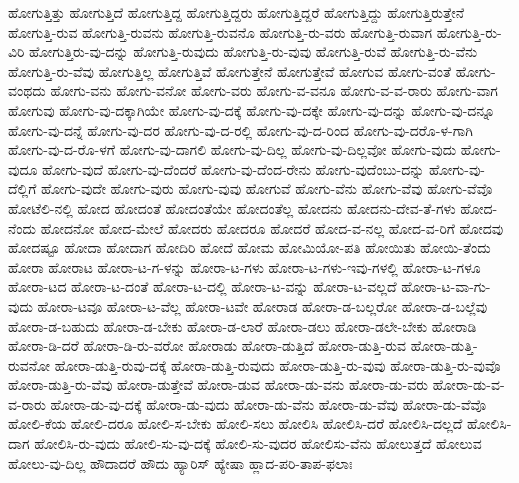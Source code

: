 {ಹೋಗುತ್ತಿತ್ತು
ಹೋಗುತ್ತಿದೆ
ಹೋಗುತ್ತಿದ್ದ
ಹೋಗುತ್ತಿದ್ದರು
ಹೋಗುತ್ತಿದ್ದರೆ
ಹೋಗುತ್ತಿದ್ದು
ಹೋಗುತ್ತಿರುತ್ತೇನೆ
ಹೋಗುತ್ತಿ-ರುವ
ಹೋಗುತ್ತಿ-ರುವನು
ಹೋಗುತ್ತಿ-ರುವನೊ
ಹೋಗುತ್ತಿ-ರು-ವರು
ಹೋಗುತ್ತಿ-ರುವಾಗ
ಹೋಗುತ್ತಿ-ರು-ವಿರಿ
ಹೋಗುತ್ತಿರು-ವು-ದನ್ನು
ಹೋಗುತ್ತಿ-ರುವುದು
ಹೋಗುತ್ತಿ-ರು-ವುವು
ಹೋಗುತ್ತಿ-ರುವೆ
ಹೋಗುತ್ತಿ-ರು-ವೆನು
ಹೋಗುತ್ತಿ-ರು-ವೆವು
ಹೋಗುತ್ತಿಲ್ಲ
ಹೋಗುತ್ತಿವೆ
ಹೋಗುತ್ತೇನೆ
ಹೋಗುತ್ತೇವೆ
ಹೋಗುವ
ಹೋಗು-ವಂತೆ
ಹೋಗು-ವಂಥದು
ಹೋಗು-ವನು
ಹೋಗು-ವನೋ
ಹೋಗು-ವರು
ಹೋಗು-ವ-ವನೂ
ಹೋಗು-ವ-ವ-ರಾರು
ಹೋಗು-ವಾಗ
ಹೋಗುವು
ಹೋಗು-ವು-ದಕ್ಕಾಗಿಯೇ
ಹೋಗು-ವು-ದಕ್ಕೆ
ಹೋಗು-ವು-ದಕ್ಕೇ
ಹೋಗು-ವು-ದನ್ನು
ಹೋಗು-ವು-ದನ್ನೂ
ಹೋಗು-ವು-ದನ್ನೆ
ಹೋಗು-ವು-ದರ
ಹೋಗು-ವು-ದ-ರಲ್ಲಿ
ಹೋಗು-ವು-ದ-ರಿಂದ
ಹೋಗು-ವು-ದರೊ-ಳ-ಗಾಗಿ
ಹೋಗು-ವು-ದ-ರೊ-ಳಗೆ
ಹೋಗು-ವು-ದಾಗಲಿ
ಹೋಗು-ವು-ದಿಲ್ಲ
ಹೋಗು-ವು-ದಿಲ್ಲವೋ
ಹೋಗು-ವುದು
ಹೋಗು-ವುದೂ
ಹೋಗು-ವುದೆ
ಹೋಗು-ವು-ದೆಂದರೆ
ಹೋಗು-ವು-ದೆಂದ-ರೇನು
ಹೋಗು-ವುದೆಂಬು-ದನ್ನು
ಹೋಗು-ವು-ದೆಲ್ಲಿಗೆ
ಹೋಗು-ವುದೇ
ಹೋಗು-ವುರು
ಹೋಗು-ವುವು
ಹೋಗುವೆ
ಹೋಗು-ವೆನು
ಹೋಗು-ವೆವು
ಹೋಗು-ವೆವೊ
ಹೋಟೆಲಿ-ನಲ್ಲಿ
ಹೋದ
ಹೋದಂತೆ
ಹೋದಂತೆಯೇ
ಹೋದಂತೆಲ್ಲ
ಹೋದನು
ಹೋದನು-ದೇವ-ತೆ-ಗಳು
ಹೋದ-ನೆಂದು
ಹೋದನೋ
ಹೋದ-ಮೇಲೆ
ಹೋದರು
ಹೋದರೂ
ಹೋದರೆ
ಹೋದ-ವ-ನಲ್ಲ
ಹೋದ-ವ-ರಿಗೆ
ಹೋದವು
ಹೋದಷ್ಟೂ
ಹೋದಾ
ಹೋದಾಗ
ಹೋದಿರಿ
ಹೋದೆ
ಹೋಮ
ಹೋಮಿಯೋ-ಪತಿ
ಹೋಯಿತು
ಹೋಯಿ-ತೆಂದು
ಹೋರಾ
ಹೋರಾಟ
ಹೋರಾ-ಟ-ಗ-ಳನ್ನು
ಹೋರಾ-ಟ-ಗಳು
ಹೋರಾ-ಟ-ಗಳು-ಇವು-ಗಳಲ್ಲಿ
ಹೋರಾ-ಟ-ಗಳೂ
ಹೋರಾ-ಟದ
ಹೋರಾ-ಟ-ದಂತೆ
ಹೋರಾ-ಟ-ದಲ್ಲಿ
ಹೋರಾ-ಟ-ವನ್ನು
ಹೋರಾ-ಟ-ವಲ್ಲದೆ
ಹೋರಾ-ಟ-ವಾ-ಗು-ವುದು
ಹೋರಾ-ಟವೂ
ಹೋರಾ-ಟ-ವೆಲ್ಲ
ಹೋರಾ-ಟವೇ
ಹೋರಾಡ
ಹೋರಾ-ಡ-ಬಲ್ಲರೋ
ಹೋರಾ-ಡ-ಬಲ್ಲೆವು
ಹೋರಾ-ಡ-ಬಹುದು
ಹೋರಾ-ಡ-ಬೇಕು
ಹೋರಾ-ಡ-ಲಾರೆ
ಹೋರಾ-ಡಲು
ಹೋರಾ-ಡಲೇ-ಬೇಕು
ಹೋರಾಡಿ
ಹೋರಾ-ಡಿ-ದರೆ
ಹೋರಾ-ಡಿ-ರು-ವರೋ
ಹೋರಾಡು
ಹೋರಾ-ಡುತ್ತಿದೆ
ಹೋರಾ-ಡುತ್ತಿ-ರುವ
ಹೋರಾ-ಡುತ್ತಿ-ರುವನೋ
ಹೋರಾ-ಡುತ್ತಿ-ರುವು-ದಕ್ಕೆ
ಹೋರಾ-ಡುತ್ತಿ-ರುವುದು
ಹೋರಾ-ಡುತ್ತಿ-ರು-ವುವು
ಹೋರಾ-ಡುತ್ತಿ-ರು-ವುವೊ
ಹೋರಾ-ಡುತ್ತಿ-ರು-ವೆವು
ಹೋರಾ-ಡುತ್ತೇವೆ
ಹೋರಾ-ಡುವ
ಹೋರಾ-ಡು-ವನು
ಹೋರಾ-ಡು-ವರು
ಹೋರಾ-ಡು-ವ-ವ-ರಾರು
ಹೋರಾ-ಡು-ವು-ದಕ್ಕೆ
ಹೋರಾ-ಡು-ವುದು
ಹೋರಾ-ಡು-ವೆನು
ಹೋರಾ-ಡು-ವೆವು
ಹೋರಾ-ಡು-ವೆವೊ
ಹೋಲಿ-ಕೆಯ
ಹೋಲಿ-ದರೂ
ಹೋಲಿ-ಸ-ಬೇಕು
ಹೋಲಿ-ಸಲು
ಹೋಲಿಸಿ
ಹೋಲಿಸಿ-ದರೆ
ಹೋಲಿಸಿ-ದಲ್ಲದೆ
ಹೋಲಿಸಿ-ದಾಗ
ಹೋಲಿಸಿ-ರು-ವುದು
ಹೋಲಿ-ಸು-ವು-ದಕ್ಕೆ
ಹೋಲಿ-ಸು-ವುದರ
ಹೋಲಿಸು-ವೆನು
ಹೋಲುತ್ತದೆ
ಹೋಲುವ
ಹೋಲು-ವು-ದಿಲ್ಲ
ಹೌದಾದರೆ
ಹೌದು
ಹ್ಯಾರಿಸ್
ಹ್ಯೇಷಾ
ಹ್ಲಾದ-ಪರಿ-ತಾಪ-ಫಲಾಃ
}
